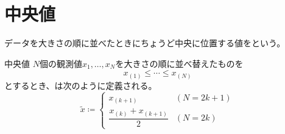 \documentclass[../../../topic_probability-statistics]{subfiles}
\begin{document}
\section{中央値}

データを大きさの順に並べたときにちょうど中央に位置する値をという。

\begin{definition}{中央値}
  $N$個の観測値$x_1, \ldots, x_N$を大きさの順に並べ替えたものを
  \begin{equation*}
    x_{(1)} \leq \cdots \leq x_{(N)}
  \end{equation*}
  とするとき、は次のように定義される。
  \begin{equation*}
    \tilde{x} \coloneq
    \begin{cases}
      x_{(k+1)} & (N = 2k + 1) \\
      \dfrac{x_{(k)} + x_{(k+1)}}{2} & (N = 2k)
    \end{cases}
  \end{equation*}
\end{definition}
\end{document}
